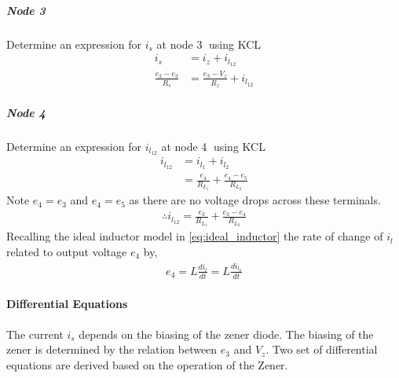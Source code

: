 \subparagraph{Node \textcircled{3}}
Determine an expression for $i_s$ at node \textcircled{3} using KCL
\begin{equation}
	\begin{split}
		i_s &= i_z + i_{l_{12}} \\
		\frac{e_2 - e_3}{R_s} &= \frac{e_3 - V_z}{R_z} + i_{l_{12}}
	\end{split}
	\label{eq:fullLoad_node3}
\end{equation}

\subparagraph{Node \textcircled{4}}
Determine an expression for $i_{l_{12}}$ at node \textcircled{4} using KCL
\begin{equation}
	\begin{split}
		i_{l_{12}} &= i_{l_1} + i_{l_2} \\
		    &= \frac{e_4}{R_{L_1}} + \frac{e_4 - e_5}{R_{L_2}}
	\end{split}
\end{equation}
Note $e_4 = e_3$ and $e_4 = e_5$ as there are no voltage drops across these terminals.
\begin{equation}
	\begin{split}
	 \therefore i_{l_{12}} = \frac{e_3}{R_{L_1}} + \frac{e_3 - e_4}{R_{L_2}}
	\end{split}
	\label{eq:fullLoad_node4}
\end{equation}
Recalling the ideal inductor model in \eqref{eq:ideal_inductor} the rate of change of $i_{l}$ related to output voltage $e_4$ by,
\begin{equation}
	\begin{split}
		e_4 = L\frac{di_l}{dt} = L\frac{di_{l_2}}{dt}
	\end{split}
	\label{eq:fullLoad_output}
\end{equation}

\paragraph{Differential Equations}
The current $i_s$ depends on the biasing of the zener diode. The biasing of the zener is determined by the relation between $e_3$ and $V_z$. Two set of differential equations are derived based on the operation of the Zener.

